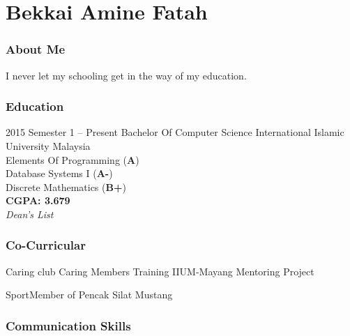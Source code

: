 \documentclass[12pt]{tccv}
\begin{document}
  
\part{Bekkai Amine Fatah}


\section{About Me}

\begin{fquote}I never let my schooling get in the way of my 	education.
\end{fquote}


\section{Education}

\begin{eventlist}

\item{2015 Semester 1 -- Present}
     {Bachelor Of Computer Science}
     {\normalsize{International Islamic University Malaysia}}\\
     \small {Elements Of Programming (\textbf{A})}\\
     \small{Database Systems I (\textbf{A-})}\\
     \small{Discrete Mathematics (\textbf{B+})}\\
     \textbf{CGPA: 3.679}\\
     \textit{Dean's List}
\end{eventlist}




\section{Co-Curricular}

\begin{factlist}
	\item{Caring club}
	{Caring Members Training\vspace{2mm}
	 IIUM-Mayang Mentoring Project}
	
	\item{Sport}{Member of Pencak Silat Mustang}
\end{factlist}


\section{Communication Skills}
\end{document}
